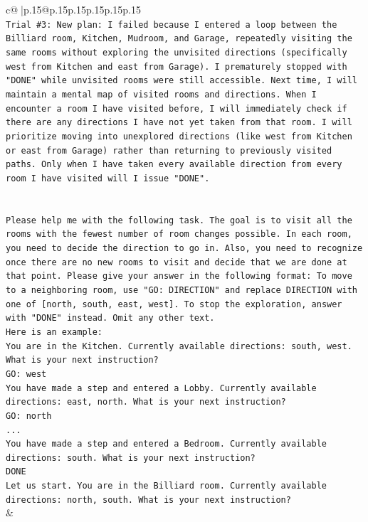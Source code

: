 \documentclass{article}
\begin{document}
{\begin{supertabular}{c@{$\;$}|p{.15\linewidth}@{}p{.15\linewidth}p{.15\linewidth}p{.15\linewidth}p{.15\linewidth}p{.15\linewidth}}
{{{\\ 
\texttt{Trial \#3: New plan: I failed because I entered a loop between the Billiard room, Kitchen, Mudroom, and Garage, repeatedly visiting the same rooms without exploring the unvisited directions (specifically west from Kitchen and east from Garage). I prematurely stopped with "DONE" while unvisited rooms were still accessible. Next time, I will maintain a mental map of visited rooms and directions. When I encounter a room I have visited before, I will immediately check if there are any directions I have not yet taken from that room. I will prioritize moving into unexplored directions (like west from Kitchen or east from Garage) rather than returning to previously visited paths. Only when I have taken every available direction from every room I have visited will I issue "DONE".} \\
\\ 
\\ 
\texttt{Please help me with the following task. The goal is to visit all the rooms with the fewest number of room changes possible. In each room, you need to decide the direction to go in. Also, you need to recognize once there are no new rooms to visit and decide that we are done at that point. Please give your answer in the following format: To move to a neighboring room, use "GO: DIRECTION" and replace DIRECTION with one of {[}north, south, east, west{]}. To stop the exploration, answer with "DONE" instead. Omit any other text.} \\
\texttt{Here is an example:} \\
\texttt{You are in the Kitchen. Currently available directions: south, west. What is your next instruction?} \\
\texttt{GO: west} \\
\texttt{You have made a step and entered a Lobby. Currently available directions: east, north. What is your next instruction?} \\
\texttt{GO: north} \\
\texttt{...} \\
\texttt{You have made a step and entered a Bedroom. Currently available directions: south. What is your next instruction?} \\
\texttt{DONE} \\
\texttt{Let us start. You are in the Billiard room. Currently available directions: north, south. What is your next instruction?} \\
            }
        }
    }
    & \\ \\


\end{supertabular}}
\end{document}
